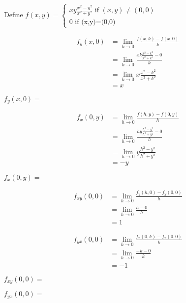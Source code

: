 \documentclass{ximera}
\begin{document}
	\begin{question}
		Define \(f(x,y) = \begin{cases} 
				xy\frac{x^2-y^2}{x^2+y^2} \text{ if $(x,y) \neq (0,0)$}\\
				0 \text{ if (x,y)=(0,0)}
				\end{cases}\)
		\begin{solution}
			
			\begin{hint}
				\begin{question}
					\begin{solution}
						\begin{hint}
							\begin{align*}
							f_y(x,0) &=  \displaystyle\lim_{k \to 0} \frac{f(x,k)-f(x,0)}{k}\\
								&= \displaystyle\lim_{k \to 0} \frac{xk\frac{x^2-k^2}{x^2+k^2} - 0}{k}\\
								&=\displaystyle\lim_{k \to 0} x\frac{x^2-k^2}{x^2+k^2}\\
								&=x
							\end{align*}
						\end{hint}
						$f_y(x,0) = $
					\end{solution}
					\begin{solution}
						\begin{hint}
							\begin{align*}
							f_x(0,y) &=  \displaystyle\lim_{h \to 0} \frac{f(h,y)-f(0,y)}{h}\\
								&= \displaystyle\lim_{h \to 0} \frac{hy\frac{h^2-y^2}{h^2+y^2} - 0}{h}\\
								&=\displaystyle\lim_{h \to 0} y\frac{h^2-y^2}{h^2+y^2}\\
								&=-y
							\end{align*}
						\end{hint}
						$f_x(0,y) = $\answer{$-y$}
					\end{solution}
				\end{question}
			\end{hint}
			\begin{hint}
				\begin{align*}
					f_{xy}(0,0) &= \displaystyle\lim_{h \to 0} \frac{f_y(h,0) - f_y(0,0)}{h}\\
						&=\displaystyle\lim_{h \to 0} \frac{h -0}{h}\\
						&=1
				\end{align*}
			\end{hint}
			\begin{hint}
				\begin{align*}
					f_{yx}(0,0) &= \displaystyle\lim_{k \to 0} \frac{f_x(0,k) - f_x(0,0)}{k}\\
						&=\displaystyle\lim_{h \to 0} \frac{-k -0}{k}\\
						&=-1
				\end{align*}
			\end{hint}
			
			$f_{xy}(0,0)=$\answer{$1$}
		\end{solution}
		\begin{solution}
			$f_{yx}(0,0)=$\answer{$-1$}
		\end{solution}
	\end{question}
	
	
	
\end{document}
